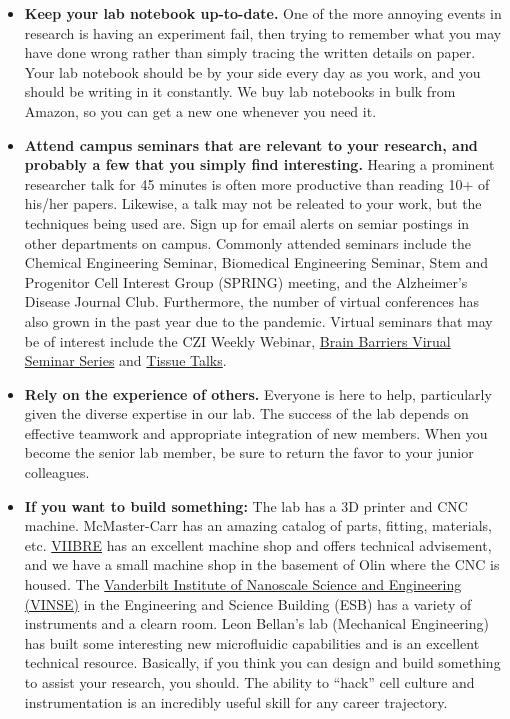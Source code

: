 \documentclass[
]{book}
\begin{document}
\begin{itemize}
\item
  \textbf{Keep your lab notebook up-to-date.} One of the more annoying events in research is having an experiment fail, then trying to remember what you may have done wrong rather than simply tracing the written details on paper. Your lab notebook should be by your side every day as you work, and you should be writing in it constantly. We buy lab notebooks in bulk from Amazon, so you can get a new one whenever you need it.
\item
  \textbf{Attend campus seminars that are relevant to your research, and probably a few that you simply find interesting.} Hearing a prominent researcher talk for 45 minutes is often more productive than reading 10+ of his/her papers. Likewise, a talk may not be releated to your work, but the techniques being used are. Sign up for email alerts on semiar postings in other departments on campus. Commonly attended seminars include the Chemical Engineering Seminar, Biomedical Engineering Seminar, Stem and Progenitor Cell Interest Group (SPRING) meeting, and the Alzheimer's Disease Journal Club. Furthermore, the number of virtual conferences has also grown in the past year due to the pandemic. Virtual seminars that may be of interest include the CZI Weekly Webinar, \href{https://www.ibbsoc.org/events-calendar/brain-barriers-virtual-2020-bbv2020-seminar-series}{Brain Barriers Virual Seminar Series} and \href{https://www.bme.columbia.edu/tissue-talks-weekly-webinar-series-hosted-dr-gordana-vunjak-novakovic}{Tissue Talks}.
\item
  \textbf{Rely on the experience of others.} Everyone is here to help, particularly given the diverse expertise in our lab. The success of the lab depends on effective teamwork and appropriate integration of new members. When you become the senior lab member, be sure to return the favor to your junior colleagues.
\item
  \textbf{If you want to build something:} The lab has a 3D printer and CNC machine. McMaster-Carr has an amazing catalog of parts, fitting, materials, etc. \href{https://www.vanderbilt.edu/viibre/}{VIIBRE} has an excellent machine shop and offers technical advisement, and we have a small machine shop in the basement of Olin where the CNC is housed. The \href{https://www.vanderbilt.edu/vinse/}{Vanderbilt Institute of Nanoscale Science and Engineering (VINSE)} in the Engineering and Science Building (ESB) has a variety of instruments and a clearn room. Leon Bellan's lab (Mechanical Engineering) has built some interesting new microfluidic capabilities and is an excellent technical resource. Basically, if you think you can design and build something to assist your research, you should. The ability to ``hack'' cell culture and instrumentation is an incredibly useful skill for any career trajectory.
\end{itemize}
\end{document}
